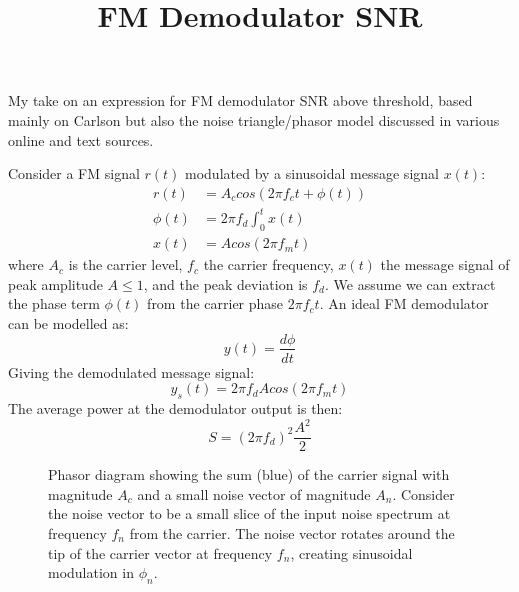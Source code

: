 \documentclass{article}
\begin{document}
\title{FM Demodulator SNR}
\maketitle

My take on an expression for FM demodulator SNR above threshold, based mainly on Carlson \cite{crilly2009communication} but also the noise triangle/phasor model discussed in various online and text sources.

Consider a FM signal $r(t)$ modulated by a sinusoidal message signal $x(t)$:
\begin{equation}
\begin{split}
r(t) &= A_c cos(2 \pi f_c t +\phi(t)) \\
\phi(t) &=  2 \pi f_d \int_0^t x(t) \\
x(t) &= A cos(2 \pi f_m t)
\end{split}
\end{equation}
where $A_c$ is the carrier level, $f_c$ the carrier frequency, $x(t)$ the message signal of peak amplitude $A \le 1$, and the peak deviation is $f_d$.  We assume we can extract the phase term $\phi(t)$ from the carrier phase $2 \pi f_c t$. An ideal FM demodulator can be modelled as: 
\begin{equation}
y(t) = \frac{d\phi}{dt}
\end{equation}
Giving the demodulated message signal:
\begin{equation}
\label{eq:fm_signal}
y_s(t) = 2 \pi f_d A cos (2 \pi f_m t)
\end{equation}
The average power at the demodulator output is then:
\begin{equation}
\label{eq:fm_signal_power}
S = (2 \pi f_d )^2 \frac{A^2}{2}
\end{equation}

\begin{figure}[h]
\begin{center}
\end{center}
\caption{Phasor diagram showing the sum (blue) of the carrier signal with magnitude $A_c$ and a small noise vector of magnitude $A_n$.  Consider the noise vector to be a small slice of the input noise spectrum at frequency $f_n$ from the carrier. The noise vector rotates around the tip of the carrier vector at frequency $f_n$, creating sinusoidal modulation in $\phi_n$.}
\label{fig:phasor}
\end{figure}
\end{document}
